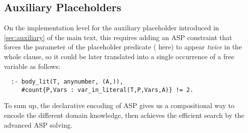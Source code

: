 \subsection{Auxiliary Placeholders}
\label{app:auxiliary}

On the implementation level for the auxiliary placeholder introduced in \autoref{sec:auxiliary} of the main text, this requires adding an ASP constraint
that forces the parameter of the placeholder predicate (
here) to appear \emph{twice} in the whole clause, so it could be later
translated into a single occurrence of a free variable as follows:

\begin{verbatim}
  :- body_lit(T, anynumber, (A,)),
     #count{P,Vars : var_in_literal(T,P,Vars,A)} != 2.
\end{verbatim}


\vspace{1em}
To sum up, the declarative encoding of ASP gives us a compositional way to encode the different domain knowledge, then achieves the efficient search by the advanced ASP solving. 
